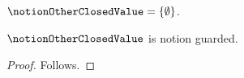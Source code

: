 

\begin{definition}\label{notion_other_closed_value}
    $\notionOtherClosedValue=\{\emptyset\}$.
\end{definition}

\begin{proposition}\label{notion_other_closed_value_guard}
    $\notionOtherClosedValue$ is notion guarded.
\end{proposition}
\begin{proof}
    Follows.
\end{proof}
